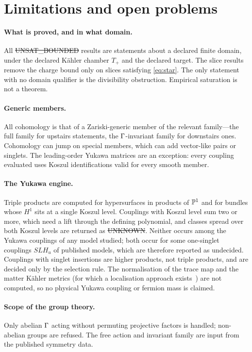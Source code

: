 \section{Limitations and open problems}
\label{sec:limitations}

\paragraph{What is proved, and in what domain.} All \st{UNSAT\_BOUNDED} results
are statements about a declared finite domain, under the declared Kähler chamber
$T_+$ and the declared target. The slice results remove the charge bound only on
slices satisfying \eqref{eq:star}. The only statement with no domain qualifier
is the divisibility obstruction. Empirical saturation is not a theorem.

\paragraph{Generic members.} All cohomology is that of a Zariski-generic member
of the relevant family---the full family for upstairs statements, the
$\Gamma$-invariant family for downstairs ones. Cohomology can jump on special
members, which can add vector-like pairs or singlets. The leading-order Yukawa
matrices are an exception: every coupling evaluated uses Koszul identifications
valid for every smooth member.

\paragraph{The Yukawa engine.} Triple products are computed for hypersurfaces in
products of $\mathbb{P}^1$ and for bundles whose $H^1$ sits at a single Koszul level.
Couplings with Koszul level sum two or more, which need a lift through the
defining polynomial, and classes spread over both Koszul levels are returned as
\st{UNKNOWN}. Neither occurs among the Yukawa couplings of any model studied;
both occur for some one-singlet couplings $SLH_u$ of published models, which
are therefore reported as undecided. Couplings with singlet insertions are higher products, not triple
products, and are decided only by the selection rule. The normalisation of the
trace map and the matter Kähler metrics (for which a localisation approach
exists~\cite{BBCLP2018}) are not computed, so no physical Yukawa coupling or
fermion mass is claimed.

\paragraph{Scope of the group theory.} Only abelian $\Gamma$ acting without
permuting projective factors is handled; non-abelian groups are refused. The
free action and invariant family are input from the published symmetry data.

